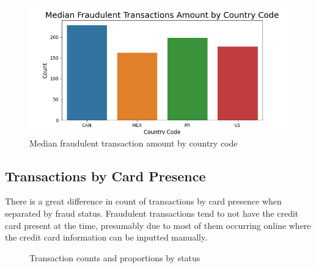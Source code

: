 \documentclass[12pt]{article}
\begin{document}
\begin{figure}[h]
    \centering
    \includegraphics[width=\textwidth]{images/median_fraud_trans_amount_by_country.png}
    \caption{Median fraudulent transaction amount by country code}
    \label{fig:my_label}
\end{figure}


\subsection{Transactions by Card Presence}
There is a great difference in count of transactions by card presence when separated by fraud status. Fraudulent transactions tend to not have the credit card present at the time, presumably due to most of them occurring online where the credit card information can be inputted manually.

\begin{figure}[h!]
    \centering
    \vspace{\baselineskip}
    \label{fig:side-by-side}
    \caption{Transaction counts and proportions by status}
\end{figure}
\end{document}
